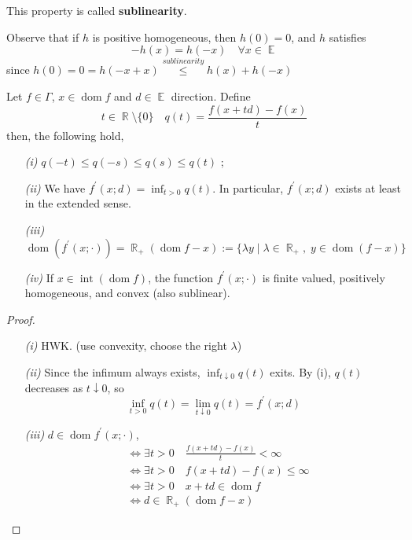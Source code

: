 \documentclass{tufte-handout}
\DeclareMathOperator{\dom}{dom}
\DeclareMathOperator{\R}{\mathbb{R}}
\DeclareMathOperator{\E}{\mathbb{E}}
\DeclareMathOperator{\inte}{int}
\begin{document}
{{   This property is called \textbf{sublinearity}. 
\begin{remark} 
  Observe that if $h$ is positive homogeneous, then $h(0) = 0$, and $h$ satisfies 
  $$-h(x )= h(-x) \quad \forall x \in \E $$
  since $h(0) =0 = h(-x+x) \overset{sublinearity}{\leq} h(x) + h(-x)$
\end{remark}
\begin{proposition} \label{prop:dirdercon}
  Let $f \in \Gamma$, $ x\in \dom f$ and $ d\in \E$ direction. Define $$t\in \R \setminus \{0\} \quad q(t) = \frac{f(x+ td) - f(x)}{t}  $$ 
  then, the following hold, 
  \begin{enumerate}
    \item[\it (i)] $q(-t) \leq q(-s ) \leq q(s) \leq q(t)$ ;
    \item[\it (ii)] We have $f^\prime (x; d) = \inf_{t> 0} q(t).$ In particular, $f^\prime(x;d)$ exists at least in the extended sense. 
    \item[\it (iii)] $\dom (f^\prime (x; \cdot {})) = \R_+ (\dom f - x) := \{\lambda y \mid \lambda \in \R_+ , \; y \in \dom (f -x)\}$
    \item[\it (iv)] If $x \in \inte (\dom f)$, the function $f^\prime (x ; \cdot )$ is finite valued, positively homogeneous, and convex (also sublinear).
  \end{enumerate}
  \begin{proof} 
    $  $
    \begin{enumerate}
      \item[\it (i)] HWK. (use convexity, choose the right $\lambda$)
      \item[\it (ii)] Since the infimum always exists, $\inf_{t\downarrow 0} q(t)$ exits. By (i), $q(t)$ decreases as $t \downarrow 0$, so $$\inf_{t> 0} q(t) = \lim_{t\downarrow 0} q(t) = f^\prime (x; d)$$
      \item[\it (iii)] $d \in \dom f^\prime (x; \cdot )$, 
      \begin{equation*}
        \begin{split}
          &\iff \exists t >0 \quad \frac{f(x + td ) - f(x)}{t} < \infty \\ 
          &\iff \exists t>0 \quad f(x + td ) - f(x) \leq \infty \\ 
          &\iff \exists t > 0 \quad x + td \in \dom f \\ 
          & \iff d\in \R_+ (\dom f - x)
        \end{split}
      \end{equation*}

\end{enumerate}
\end{proof}
\end{proposition}}}
\end{document}
